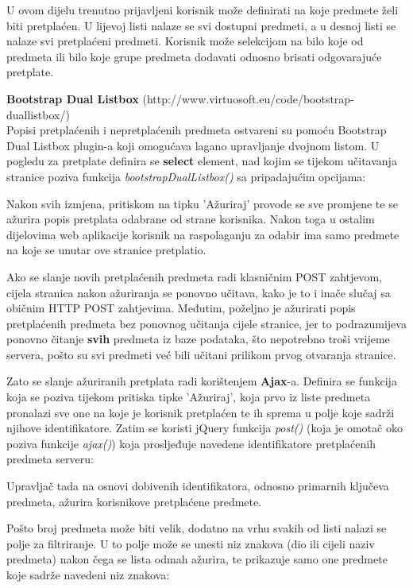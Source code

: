 \documentclass[times, utf8, zavrsni]{fer}
\begin{document}
U ovom dijelu trenutno prijavljeni korisnik može definirati na koje predmete želi biti pretplaćen. U lijevoj listi nalaze se svi dostupni predmeti, a u desnoj listi se nalaze svi pretplaćeni predmeti. Korisnik može selekcijom na bilo koje od predmeta ili bilo koje grupe predmeta dodavati odnosno brisati odgovarajuće pretplate. 

\textbf{Bootstrap Dual Listbox} (http://www.virtuosoft.eu/code/bootstrap-duallistbox/)\\
Popisi pretplaćenih i nepretplaćenih predmeta ostvareni su pomoću Bootstrap Dual Listbox plugin-a koji omogućava lagano upravljanje dvojnom listom. U pogledu za pretplate definira se \textbf{select} element, nad kojim se tijekom učitavanja stranice poziva funkcija \emph{bootstrapDualListbox()} sa pripadajućim opcijama:

\lstset{style=js}


Nakon svih izmjena, pritiskom na tipku 'Ažuriraj' provode se sve promjene te se ažurira popis pretplata odabrane od strane korisnika. Nakon toga u ostalim dijelovima web aplikacije korisnik na raspolaganju za odabir ima samo predmete na koje se unutar ove stranice pretplatio.

Ako se slanje novih pretplaćenih predmeta radi klasničnim POST zahtjevom, cijela stranica nakon ažuriranja se ponovno učitava, kako je to i inače slučaj sa običnim HTTP POST zahtjevima. Međutim, poželjno je ažurirati popis pretplaćenih predmeta bez ponovnog učitanja cijele stranice, jer to podrazumijeva ponovno čitanje \textbf{svih} predmeta iz baze podataka, što nepotrebno troši vrijeme servera, pošto su svi predmeti već bili učitani prilikom prvog otvaranja stranice.

Zato se slanje ažuriranih pretplata radi korištenjem \textbf{Ajax}-a. Definira se funkcija koja se poziva tijekom pritiska tipke 'Ažuriraj', koja prvo iz liste predmeta pronalazi sve one na koje je korisnik pretplaćen te ih sprema u polje koje sadrži njihove identifikatore. Zatim se koristi jQuery funkcija \emph{post()} (koja je omotač oko poziva funkcije \emph{ajax()}) koja prosljeđuje navedene identifikatore pretplaćenih predmeta serveru:

\lstset{style=js}


Upravljač tada na osnovi dobivenih identifikatora, odnosno primarnih ključeva predmeta, ažurira korisnikove pretplaćene predmete.

Pošto broj predmeta može biti velik, dodatno na vrhu svakih od listi nalazi se polje za filtriranje. U to polje može se unesti niz znakova (dio ili cijeli naziv predmeta) nakon čega se lista odmah ažurira, te prikazuje samo one predmete koje sadrže navedeni niz znakova:
\end{document}
